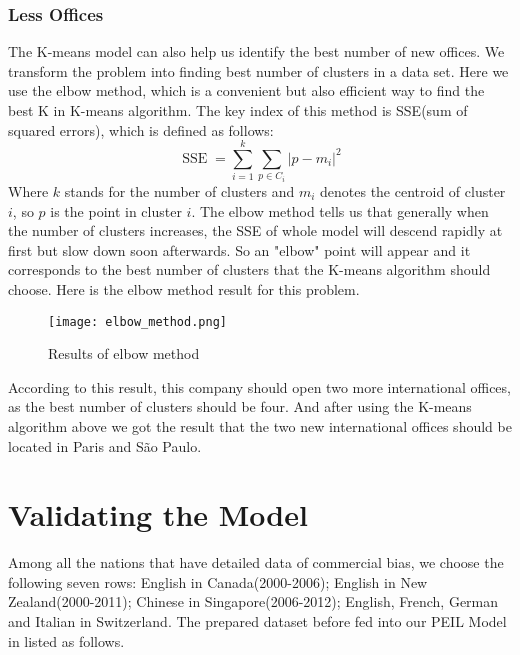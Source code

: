 \documentclass{mcmthesis}
\begin{document}
    \subsubsection{Less Offices}
  
    \indent \indent The K-means model can also help us identify the best number of new offices. We transform the problem into finding best number of clusters in a data set. Here we use the elbow method, which is a convenient but also efficient way to find the best K in K-means algorithm. The key index of this method is SSE(sum of squared errors), which is defined as follows:
    \begin{equation}
      \mathop{SSE} = \sum^k_{i=1}\sum_{p\in C_i}\left|p-m_i\right|^2
    \end{equation}
    \indent Where $k$ stands for the number of clusters and $m_i$ denotes the centroid of cluster $i$, so $p$ is the point in cluster $i$. The elbow method tells us that generally when the number of clusters increases, the SSE of whole model will descend rapidly at first but slow down soon afterwards. So an "elbow" point will appear and it corresponds to the best number of clusters that the K-means algorithm should choose. Here is the elbow method result for this problem.
  
    \begin{figure}[h]
      \small
      \centering
      \texttt{[image: elbow\_method.png]}
      \caption{Results of elbow method}
    \end{figure}
    \newpage
  
    \indent According to this result, this company should open two more international offices, as the best number of clusters should be four. And after using the K-means algorithm above we got the result that the two new international offices should be located in Paris and São Paulo.
    
  \section{Validating the Model}
  \indent\indent Among all the nations that have detailed data of commercial bias, we choose the following seven rows: English in Canada(2000-2006); English in New Zealand(2000-2011); Chinese in Singapore(2006-2012); English, French, German and Italian in Switzerland. The prepared dataset before fed into our PEIL Model in listed as follows. 
  
\end{document}
